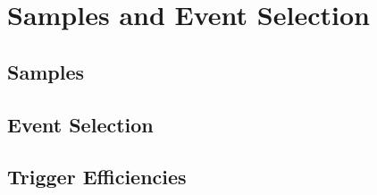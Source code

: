 \section{Samples and Event Selection}

\subsection{Samples}

\subsection{Event Selection}

\subsection{Trigger Efficiencies}
